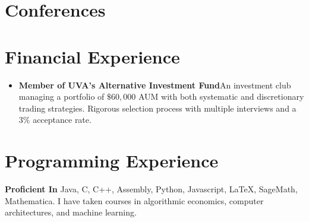 \documentclass[11pt,letterpaper,sans]{moderncv}
\begin{document}
\section{Conferences}
 


\section{Financial Experience}
\begin{itemize}
  \item \textbf{Member of UVA's Alternative Investment Fund}\quad An investment club managing a portfolio of $ \$60,000 $ AUM with both systematic and discretionary trading strategies. Rigorous selection process with multiple interviews and a $ 3\% $ acceptance rate. 
\end{itemize}

\section{Programming Experience}
\textbf{Proficient In} Java, C, C++, Assembly, Python, Javascript, \LaTeX, SageMath, Mathematica. I have taken courses in algorithmic economics, computer architectures, and machine learning.
\end{document}
